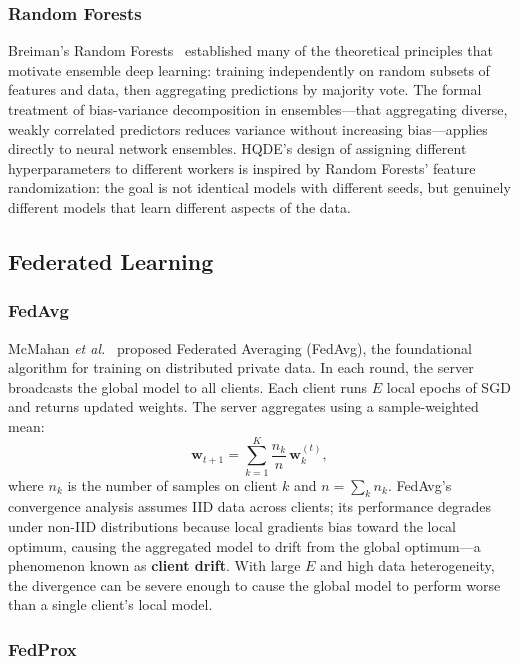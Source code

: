 \documentclass[journal,twoside]{IEEEtran}
\newcommand{\hqde}{\mbox{HQDE}\xspace}
\newcommand{\etal}{\textit{et al.}\xspace}
\begin{document}
\subsubsection{Random Forests}

Breiman's Random Forests~\cite{breiman2001} established many of the
theoretical principles that motivate ensemble deep learning: training
independently on random subsets of features and data, then aggregating
predictions by majority vote. The formal treatment of bias-variance
decomposition in ensembles---that aggregating diverse, weakly correlated
predictors reduces variance without increasing bias---applies directly
to neural network ensembles. \hqde{}'s design of assigning different
hyperparameters to different workers is inspired by Random Forests'
feature randomization: the goal is not identical models with different
seeds, but genuinely different models that learn different aspects of
the data.

\subsection{Federated Learning}

\subsubsection{FedAvg}

McMahan \etal~\cite{mcmahan2017} proposed Federated Averaging (FedAvg),
the foundational algorithm for training on distributed private data.
In each round, the server broadcasts the global model to all clients.
Each client runs $E$ local epochs of SGD and returns updated weights.
The server aggregates using a sample-weighted mean:
\begin{equation}
  \mathbf{w}_{t+1} = \sum_{k=1}^{K} \frac{n_k}{n}\,\mathbf{w}_k^{(t)},
  \label{eq:fedavg}
\end{equation}
where $n_k$ is the number of samples on client $k$ and $n = \sum_k
n_k$. FedAvg's convergence analysis assumes IID data across clients;
its performance degrades under non-IID distributions because local
gradients bias toward the local optimum, causing the aggregated model
to drift from the global optimum---a phenomenon known as \textbf{client
drift}. With large $E$ and high data heterogeneity, the divergence can
be severe enough to cause the global model to perform worse than a
single client's local model.

\subsubsection{FedProx}
\end{document}
